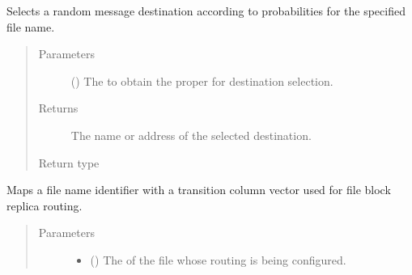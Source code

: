 \documentclass[letterpaper,10pt,english]{sphinxmanual}
\begin{document}
\begin{fulllineitems}
\begin{fulllineitems}
\label{\detokenize{app.domain:app.domain.network_nodes.SGNode.select_destination}}
Selects a random message destination according to 
probabilities for the specified file name.
\begin{quote}\begin{description}
\item[{Parameters}] \leavevmode
{} () \textendash{} The {\hyperref[\detokenize{app.domain.helpers:app.domain.helpers.smart_dataclasses.FileData.name}]{}}
to obtain the proper {\hyperref[\detokenize{app.domain:app.domain.network_nodes.SGNode.routing_table}]{}} for
destination selection.

\item[{Returns}] \leavevmode
The name or address of the selected destination.

\item[{Return type}] \leavevmode
{}

\end{description}\end{quote}

\end{fulllineitems}


\begin{fulllineitems}
\label{\detokenize{app.domain:app.domain.network_nodes.SGNode.set_file_routing}}
Maps a file name identifier with a transition column vector used
for file block replica routing.
\begin{quote}\begin{description}
\item[{Parameters}] \leavevmode\begin{itemize}
\item {} 
 () \textendash{} The {\hyperref[\detokenize{app.domain.helpers:app.domain.helpers.smart_dataclasses.FileData.name}]{}}
of the file whose routing is being configured.


\end{itemize}
\end{description}
\end{quote}
\end{fulllineitems}
\end{fulllineitems}
\end{document}
